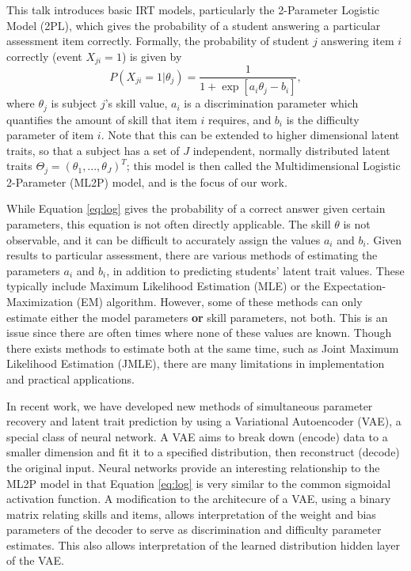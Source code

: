 \documentclass[a4paper]{article}
\begin{document}
This talk introduces basic IRT models, particularly the 2-Parameter Logistic Model (2PL), which gives the probability of a student answering a particular assessment item correctly. Formally, the probability of student $j$ answering item $i$ correctly (event $X_{ji}=1$) is given by 
\begin{equation}
P(X_{ji}=1 | \theta_j) = \frac{1}{1 + \exp[a_i \theta_j - b_i]},
\label{eq:log}
\end{equation}
where $\theta_j$ is subject $j$'s skill value, $a_i$ is a discrimination parameter which quantifies the amount of skill that item $i$ requires, and $b_i$ is the difficulty parameter of item $i$. Note that this can be extended to higher dimensional latent traits, so that a subject has a set of $J$ independent, normally distributed latent traits $\Theta_j = (\theta_1,...,\theta_J)^T$; this model is then called the Multidimensional Logistic 2-Parameter (ML2P) model, and is the focus of our work.

While Equation \ref{eq:log} gives the probability of a correct answer given certain parameters, this equation is not often directly applicable. The skill $\theta$ is not observable, and it can be difficult to accurately assign the values $a_i$ and $b_i$. Given results to particular assessment, there are various methods of estimating the parameters $a_i$ and $b_i$, in addition to predicting students' latent trait values. These typically include Maximum Likelihood Estimation (MLE) or the Expectation-Maximization (EM) algorithm. However, some of these methods can only estimate either the model parameters \textbf{or} skill parameters, not both. This is an issue since there are often times where none of these values are known. Though there exists methods to estimate both at the same time, such as Joint Maximum Likelihood Estimation (JMLE), there are many limitations in implementation and practical applications.

In recent work, we have developed new methods of simultaneous parameter recovery and latent trait prediction by using a Variational Autoencoder (VAE), a special class of neural network. A VAE aims to break down (encode) data to a smaller dimension and fit it to a specified distribution, then reconstruct (decode) the original input. Neural networks provide an interesting relationship to the ML2P model in that Equation \ref{eq:log} is very similar to the common sigmoidal activation function. A modification to the architecure of a VAE, using a binary matrix relating skills and items, allows interpretation of the weight and bias parameters of the decoder to serve as discrimination and difficulty parameter estimates. This also allows interpretation of the learned distribution hidden layer of the VAE. 
\end{document}
